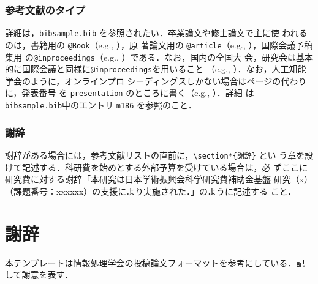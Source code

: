 \documentclass[a4j]{matsushita-zemi}
\begin{document}
\subsubsection{参考文献のタイプ}

詳細は，\verb|bibsample.bib| を参照されたい．卒業論文や修士論文で主に使
われるのは，書籍用の \verb|@Book|（e.g., \cite{okumura,companion}），原
著論文用の \verb|@article|（e.g., \cite{j024, j027}），国際会議予稿集用
の\verb|@inproceedings|（e.g., \cite{c028}）である．なお，国内の全国大
会，研究会は基本的に国際会議と同様に\verb|@inproceedings|を用いること
（e.g., \cite{m139, m174}）．なお，人工知能学会のように，オンラインプロ
シーディングスしかない場合はページの代わりに，発表番号
を \verb|presentation| のところに書く（e.g., \cite{m186}）．詳細
は \verb|bibsample.bib|中のエントリ \verb|m186| を参照のこと．


\subsubsection{謝辞}

謝辞がある場合には，参考文献リストの直前に，\verb|\section*{謝辞}| とい
う章を設けて記述する．科研費を始めとする外部予算を受けている場合は，必
ずここに研究費に対する謝辞「本研究は日本学術振興会科学研究費補助金基盤
研究（x）（課題番号：xxxxxx）の支援により実施された．」のように記述する
こと．

\section*{謝辞}
本テンプレートは情報処理学会の投稿論文フォーマットを参考にしている．記
して謝意を表す．

%


\end{document}
